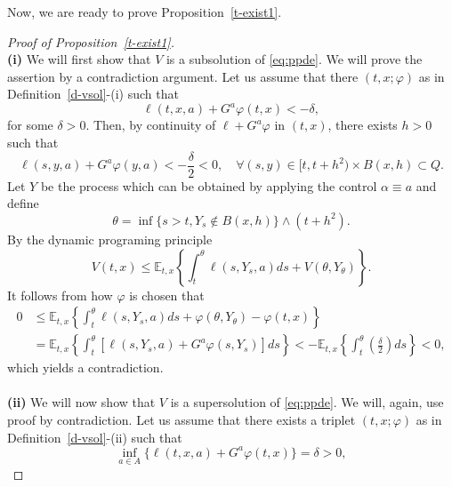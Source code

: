 \documentclass[11pt,reqno]{amsart}
\numberwithin{equation}{section}
\newcommand{\propref}[1]{Proposition~{\rm \ref{#1}}}
\begin{document}
Now, we are ready to prove \propref{t-exist1}. 
\begin{proof}[Proof of \propref{t-exist1}] \hfill \\
\noindent \textbf{(i)}
We will first show that $V$ is a subsolution of \eqref{eq:ppde}.
We will prove the assertion by a contradiction argument.
 Let us assume that there $(t,x;\varphi)$ as in Definition~\ref{d-vsol}-(i) such that
  \begin{equation*}
    \ell (t,x,a) + G^a \varphi (t,x) < - \delta,  \end{equation*}
    for some $\delta>0$.
  Then, by continuity of $\ell + G^a \varphi
  $ in $(t,x)$, there exists $h>0$ such that
  \begin{equation*}
    \ell(s,y,a) + G^a \varphi(y,a) < - \frac \delta 2 < 0, \quad \forall
    (s,y) \in [t, t+h^2) \times B(x,h) \subset Q.
  \end{equation*}
  Let $Y$ be the process which can be obtained by applying the control $\alpha \equiv a$ and define
  \begin{equation*}
    \theta = \inf \{ s>t, Y_s \notin B(x,h)\} \wedge (t+h^2).
  \end{equation*}
  By the dynamic programing principle
  \begin{equation*}
    V(t,x) \le \mathbb{E}_{t,x} \left\{ \int_t^\theta \ell(s,Y_s,a) ds +
    V(\theta, Y_{\theta}) \right\}.
  \end{equation*}
  It follows from how $\varphi$ is chosen that
  $$\begin{array}{ll}
    0 & \le \displaystyle \mathbb{E}_{t,x} \left\{ \int_t^\theta
    \ell(s,Y_s,a) ds + \varphi(\theta,Y_{\theta}) - \varphi(t,x) \right
    \}\\ 
    & = \displaystyle \mathbb{E}_{t,x} \left\{ \int_t^\theta [\ell (s,Y_s,a)
    + G^a \varphi(s,Y_s)] ds \right\}  <- \mathbb{E}_{t,x} \left\{ \int_t^\theta \left(  \frac \delta 2 \right)
    ds \right\} <0, 
  \end{array}$$
  which yields a contradiction.\\ \\
  \noindent \textbf{(ii)} We will now show that $V$ is a supersolution of \eqref{eq:ppde}. We will, again, use proof by contradiction. Let us assume that there exists a triplet $(t,x;\varphi)$ as in Definition~\ref{d-vsol}-(ii) such that 
  \begin{equation*}
    \label{eq:t-exist11}
    \inf_{a\in A} \{\ell(t,x,a) + G^a \varphi(t,x)\} = \delta>0, 
  \end{equation*}

\end{proof}
\end{document}
